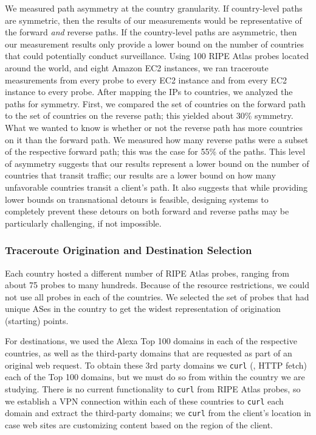 We measured path asymmetry at the country
granularity. If country-level paths are symmetric, then the results of
our measurements would be representative of the forward {\it and}
reverse paths. If the country-level paths are asymmetric, then our
measurement results only provide a lower bound on the number of countries
that could potentially conduct surveillance.  Using 100 RIPE Atlas
probes located around the world, and eight Amazon EC2 instances, we ran
traceroute measurements from every probe to every EC2 instance and from
every EC2 instance to every probe.  After mapping the IPs to countries,
we analyzed the paths for symmetry.  First, we compared the set of
countries on the forward path to the set of countries on the reverse
path; this yielded about 30\% symmetry.  What we wanted to know is
whether or not the reverse path has more countries on it than the
forward path.  We measured how many reverse paths were a subset of the
respective forward path; this was the case for 55\% of the paths.   
This level of asymmetry suggests that our results represent a lower
bound on the number of countries that transit traffic; our results are a
lower bound on how many unfavorable countries transit a client's
path. It also suggests that while providing lower bounds on
transnational detours is feasible, designing systems to completely
prevent these detours on both forward and reverse paths may be particularly
challenging, if not impossible. 

\subsubsection{Traceroute Origination and Destination Selection}

Each country hosted a different number of RIPE Atlas probes, ranging
from about 75 probes to many hundreds.  Because of the resource
restrictions, we could not use all probes in each of the countries.  We
selected the set of probes that had unique ASes in the country to get
the widest representation of origination (starting) points.

For destinations, we used the Alexa Top 100 domains in each of the
respective countries, as well as the third-party domains that are
requested as part of an original web request.  To obtain these 3rd party
domains we {\tt curl} (\ie, HTTP fetch) each of the Top 100 domains, but we must
do so from within the country we are studying.  There is no current
functionality to {\tt curl} from RIPE Atlas probes, so we establish a
VPN connection within each of these countries to {\tt curl} each domain
and extract the third-party domains; we {\tt curl} from the client's
location in case web sites are customizing content based on the region
of the client. 

